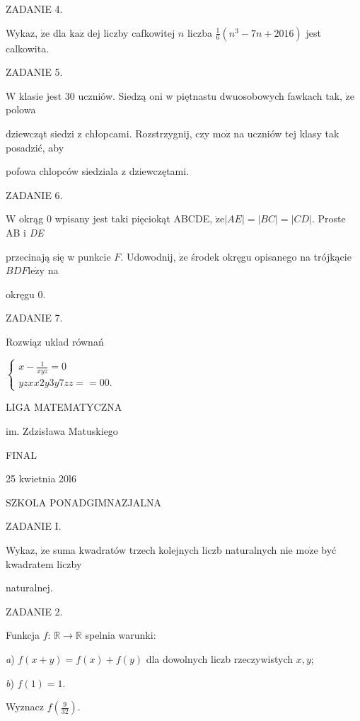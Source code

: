 \documentclass[a4paper,12pt]{article}
\begin{document}
ZADANIE 4.

Wykaz, $\dot{\mathrm{z}}\mathrm{e}$ dla $\mathrm{k}\mathrm{a}\dot{\mathrm{z}}$ dej liczby cafkowitej $n$ liczba $\displaystyle \frac{1}{6}(n^{3}-7n+2016)$ jest calkowita.

ZADANIE 5.

$\mathrm{W}$ klasie jest 30 uczniów. Siedzą oni w piętnastu dwuosobowych fawkach tak, $\dot{\mathrm{z}}\mathrm{e}$ polowa

dziewcząt siedzi z chłopcami. Rozstrzygnij, czy $\mathrm{m}\mathrm{o}\dot{\mathrm{z}}$ na uczniów tej klasy tak posadzić, aby

pofowa chlopców siedziala z dziewczętami.

ZADANIE 6.

$\mathrm{W}$ okrąg $0$ wpisany jest taki pięciokąt ABCDE, $\dot{\mathrm{z}}\mathrm{e} |AE| = |BC| = |CD|$. Proste AB $\mathrm{i}$ {\it DE}

przecinają się w punkcie $F$. Udowodnij, $\dot{\mathrm{z}}\mathrm{e}$ środek okręgu opisanego na trójkącie $BDF\mathrm{l}\mathrm{e}\dot{\mathrm{z}}\mathrm{y}$ na

okręgu $0.$

ZADANIE 7.

Rozwiąz uklad równań

$\left\{\begin{array}{l}
x-\frac{1}{xyz}=0\\
yzxx2y3y7zz==00.
\end{array}\right.$






LIGA MATEMATYCZNA

im. Zdzisława Matuskiego

FINAL

25 kwietnia 20l6

SZKOLA PONADGIMNAZJALNA

ZADANIE I.

Wykaz, $\dot{\mathrm{z}}\mathrm{e}$ suma kwadratów trzech kolejnych liczb naturalnych nie $\mathrm{m}\mathrm{o}\dot{\mathrm{z}}\mathrm{e}$ być kwadratem liczby

naturalnej.

ZADANIE 2.

Funkcja $f$: $\mathbb{R}\rightarrow \mathbb{R}$ spelnia warunki:

{\it a}) $f(x+y)=f(x)+f(y)$ dla dowolnych liczb rzeczywistych $x, y$;

{\it b}) $f(1)=1.$

Wyznacz $f(\displaystyle \frac{9}{32}).$
\end{document}

